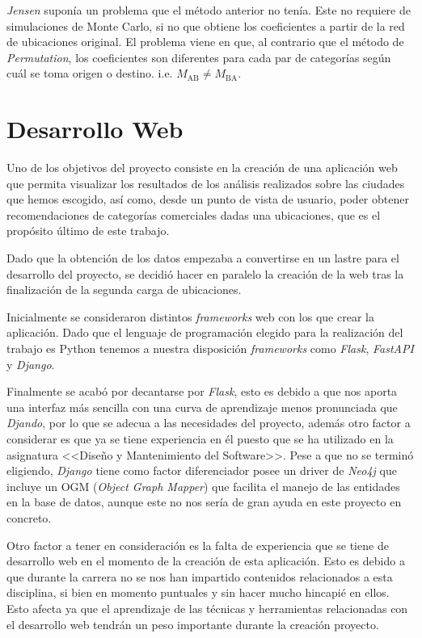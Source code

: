 \textit{Jensen} suponía un problema que el método anterior no tenía. Este no requiere de simulaciones de Monte Carlo, si no que obtiene los coeficientes a partir de la red de ubicaciones original. El problema viene en que, al contrario que el método de \textit{Permutation}, los coeficientes son diferentes para cada par de categorías según cuál se toma origen o destino. i.e. $M_\text{AB} \neq M_\text{BA}$.



\section{Desarrollo Web}
Uno de los objetivos del proyecto consiste en la creación de una aplicación web que permita visualizar los resultados de los análisis realizados sobre las ciudades que hemos escogido, así como, desde un punto de vista de usuario, poder obtener recomendaciones de categorías comerciales dadas una ubicaciones, que es el propósito último de este trabajo.

Dado que la obtención de los datos empezaba a convertirse en un lastre para el desarrollo del proyecto, se decidió hacer en paralelo la creación de la web tras la finalización de la segunda carga de ubicaciones.

Inicialmente se consideraron distintos \textit{frameworks} web con los que crear la aplicación. Dado que el lenguaje de programación elegido para la realización del trabajo es Python tenemos a nuestra disposición \textit{frameworks} como \textit{Flask}, \textit{FastAPI} y \textit{Django}.

Finalmente se acabó por decantarse por \textit{Flask}, esto es debido a que nos aporta una interfaz más sencilla con una curva de aprendizaje menos pronunciada que \textit{Djando}, por lo que se adecua a las necesidades del proyecto, además otro factor a considerar es que ya se tiene experiencia en él puesto que se ha utilizado en la asignatura <<Diseño y Mantenimiento del Software>>. Pese a que no se terminó eligiendo, \textit{Django} tiene como factor diferenciador posee un driver de \textit{Neo4j} que incluye un OGM (\textit{Object Graph Mapper}) que facilita el manejo de las entidades en la base de datos, aunque este no nos sería de gran ayuda en este proyecto en concreto.

Otro factor a tener en consideración es la falta de experiencia que se tiene de desarrollo web en el momento de la creación de esta aplicación. Esto es debido a que durante la carrera no se nos han impartido contenidos relacionados a esta disciplina, si bien en momento puntuales y sin hacer mucho hincapié en ellos. Esto afecta ya que el aprendizaje de las técnicas y herramientas relacionadas con el desarrollo web tendrán un peso importante durante la creación proyecto.

